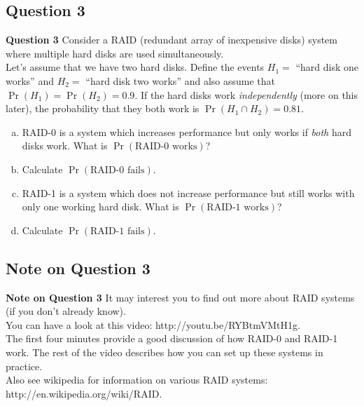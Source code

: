 \documentclass[compress]{beamer}        %
\makeatletter
\newcommand{\tcb}{\textcolor{beamer@blendedblue}}
\makeatother
\begin{document}
\subsection{Question 3}
\begin{frame}{\bf \tcb{Question 3}}
Consider a RAID (redundant array of inexpensive disks) system where multiple hard disks are used simultaneously.\\[0.2cm]
Let's assume that we have two hard disks. Define the events $H_1 =$ ``hard disk one works'' and $H_2 =$ ``hard disk two works'' and also assume that $\Pr(H_1) = \Pr(H_2) = 0.9$. If the hard disks work \emph{independently} (more on this later), the probability that they both work is $\Pr(H_1 \cap H_2) = 0.81$.\\[0.2cm]
\begin{enumerate}[a)]\itemsep0.2cm
\item RAID-0 is a system which increases performance but only works if \emph{both} hard disks work. What is $\Pr(\text{RAID-0 works})$?
\item Calculate $\Pr(\text{RAID-0 fails})$.
\item RAID-1 is a system which does not increase performance but still works with only one working hard disk. What is $\Pr(\text{RAID-1 works})$?
\item Calculate $\Pr(\text{RAID-1 fails})$.
\end{enumerate}

\end{frame}


\subsection{Note on Question 3}
\begin{frame}{\bf \tcb{Note on Question 3}}
It may interest you to find out more about RAID systems (if you don't already know).\\[0.6cm]

You can have a look at this video: \tcb{http://youtu.be/RYBtmVMtH1g}.\\[0.2cm]
The first four minutes provide a good discussion of how RAID-0 and RAID-1 work. The rest of the video describes how you can set up these systems in practice.\\[0.6cm]

Also see wikipedia for information on various RAID systems: \tcb{http://en.wikipedia.org/wiki/RAID}.

\end{frame}
\end{document}
